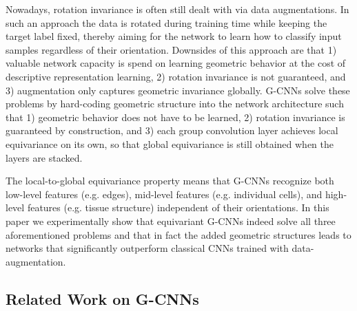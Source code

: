 \documentclass[twocolumn,final]{article}
\begin{document}
Nowadays, rotation invariance is often still dealt with via data augmentations. In such an approach the data is rotated during training time while keeping the target label fixed, thereby aiming for the network to learn how to classify input samples regardless of their orientation. Downsides of this approach are that 1) valuable network capacity is spend on learning geometric behavior at the cost of descriptive representation learning, 2) rotation invariance is not guaranteed, and 3) augmentation only captures geometric invariance globally.
G-CNNs solve these problems by hard-coding geometric structure into the network architecture such that 1) geometric behavior does not have to be learned, 2) rotation invariance is guaranteed by construction, and 3) each group convolution layer achieves local equivariance on its own, so that global equivariance is still obtained when the layers are stacked.

The local-to-global equivariance property means that G-CNNs recognize both low-level features (e.g. edges), mid-level features (e.g. individual cells), and high-level features (e.g. tissue structure) independent of their orientations. In this paper we experimentally show that  equivariant G-CNNs indeed solve all three aforementioned problems and that in fact the added geometric structures leads to networks that significantly outperform classical CNNs trained with data-augmentation.


\subsection{Related Work on G-CNNs}
\label{relatedWork}
\end{document}
